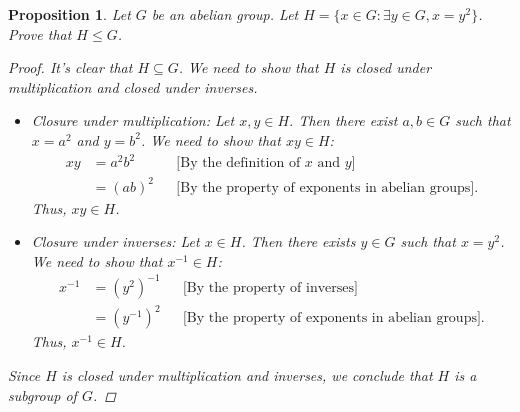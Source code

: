 \documentclass[12pt]{article}
\newtheorem{proposition}{Proposition}
\begin{document}
\begin{proposition}
  Let $G$ be an abelian group. Let $H = \{x \in G : \exists y \in G, x = y^2\}$. Prove that $H \leqslant G$.
  \begin{proof}
    It's clear that $H \subseteq G$. We need to show that $H$ is closed under multiplication and closed under inverses.
    \begin{itemize}
      \item Closure under multiplication: Let $x, y \in H$. Then there exist $a, b \in G$ such that $x = a^2$ and $y = b^2$.
            We need to show that $xy \in H$:
            \begin{align*}
              xy & = a^2b^2 &  & \text{[By the definition of } x \text{ and } y]          \\
                 & = (ab)^2 &  & \text{[By the property of exponents in abelian groups]}.
            \end{align*}
            Thus, $xy \in H$.
      \item Closure under inverses: Let $x \in H$. Then there exists $y \in G$ such that $x = y^2$.
            We need to show that $x^{-1} \in H$:
            \begin{align*}
              x^{-1} & = (y^2)^{-1} &  & \text{[By the property of inverses]}                     \\
                     & = (y^{-1})^2 &  & \text{[By the property of exponents in abelian groups]}.
            \end{align*}
            Thus, $x^{-1} \in H$.
    \end{itemize}
    Since $H$ is closed under multiplication and inverses, we conclude that $H$ is a subgroup of $G$.
  \end{proof}
\end{proposition}


\end{document}
